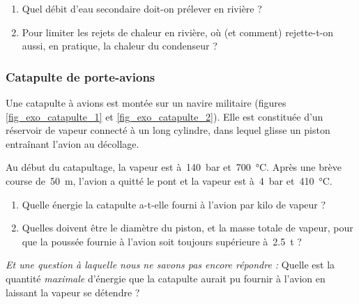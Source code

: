 	\begin{enumerate}
		\item Quel débit d’eau secondaire doit-on prélever en rivière ?
		\item Pour limiter les rejets de chaleur en rivière, où (et comment) rejette-t-on aussi, en pratique, la chaleur du condenseur ?
	\end{enumerate}
	

\subsubsection{Catapulte de porte-avions}
\label{exo_catapulte}

	Une catapulte à avions est montée sur un navire militaire (figures \ref{fig_exo_catapulte_1} et \ref{fig_exo_catapulte_2}). Elle est constituée d’un réservoir de vapeur connecté à un long cylindre, dans lequel glisse un piston entraînant l’avion au décollage.
	
	Au début du catapultage, la vapeur est à~\SI{140}{\bar} et~\SI{700}{\degreeCelsius}. Après une brève course de~\SI{50}{\metre}, l’avion a quitté le pont et la vapeur est à~\SI{4}{\bar} et~\SI{410}{\degreeCelsius}.
	
	\begin{enumerate}
		\item Quelle énergie la catapulte a-t-elle fourni à l’avion par kilo de vapeur ?
		\item Quelles doivent être le diamètre du piston, et la masse totale de vapeur, pour que la poussée fournie à l’avion soit toujours supérieure à~\SI{2,5}{\tonne} ?
	\end{enumerate}
	
	\textit{Et une question à laquelle nous ne savons pas encore répondre :} Quelle est la quantité \emph{maximale} d’énergie que la catapulte aurait pu fournir à l’avion en laissant la vapeur se détendre ?
	
